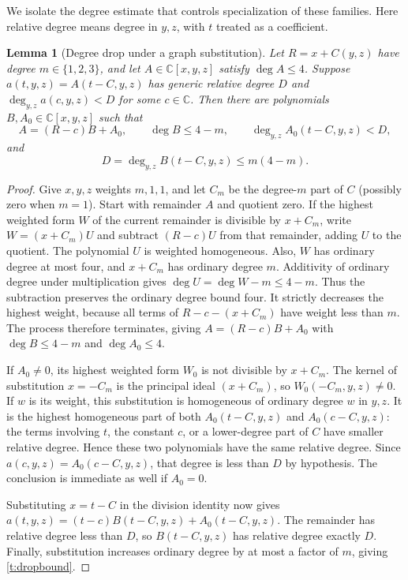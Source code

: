 \documentclass[11pt,reqno]{amsart}
\numberwithin{equation}{section}
\theoremstyle{plain}
\newtheorem{lemma}[theorem]{Lemma}
\theoremstyle{definition}
\theoremstyle{remark}
\newcommand{\C}{\mathbb C}
\begin{document}
We isolate the degree estimate that controls specialization of these
families. Here relative degree means degree in $y,z$, with $t$ treated
as a coefficient.
\begin{lemma}[Degree drop under a graph substitution]\label{lem:graph-degree-drop}
Let $R=x+C(y,z)$ have degree $m\in\{1,2,3\}$, and let
$A\in\C[x,y,z]$ satisfy $\deg A\le4$. Suppose
$a(t,y,z)=A(t-C,y,z)$ has generic relative degree $D$ and
$\deg_{y,z}a(c,y,z)<D$ for some $c\in\C$. Then there are polynomials
$B,A_0\in\C[x,y,z]$ such that
\[
 A=(R-c)B+A_0,\qquad \deg B\le4-m,
 \qquad \deg_{y,z}A_0(t-C,y,z)<D,
\]
and
\begin{equation}\label{t:dropbound}
 D=\deg_{y,z}B(t-C,y,z)\le m(4-m).
\end{equation}
\end{lemma}
\begin{proof}
Give $x,y,z$ weights $m,1,1$, and let $C_m$ be the degree-$m$ part
of $C$ (possibly zero when $m=1$). Start with remainder $A$ and
quotient zero. If the highest weighted form $W$ of the current
remainder is divisible by $x+C_m$, write $W=(x+C_m)U$ and subtract
$(R-c)U$ from that remainder, adding $U$ to the quotient.
The polynomial $U$ is weighted homogeneous. Also, $W$ has ordinary
degree at most four, and $x+C_m$ has ordinary degree $m$. Additivity
of ordinary degree under multiplication gives
$\deg U=\deg W-m\le4-m$. Thus the subtraction preserves the
ordinary degree bound four. It strictly decreases the highest weight,
because all terms of $R-c-(x+C_m)$ have weight less than $m$.
The process therefore terminates, giving
$A=(R-c)B+A_0$ with $\deg B\le4-m$ and $\deg A_0\le4$.

If $A_0\ne0$, its highest weighted form $W_0$ is not divisible by
$x+C_m$. The kernel of substitution $x=-C_m$ is the principal ideal
$(x+C_m)$, so $W_0(-C_m,y,z)\ne0$. If $w$ is its weight, this
substitution is homogeneous of ordinary degree $w$ in $y,z$.
It is the highest homogeneous part of both $A_0(t-C,y,z)$ and
$A_0(c-C,y,z)$: the terms involving $t$, the constant $c$, or a
lower-degree part of $C$ have smaller relative degree. Hence these
two polynomials have the same relative degree. Since
$a(c,y,z)=A_0(c-C,y,z)$, that degree is less than $D$ by hypothesis.
The conclusion is immediate as well if $A_0=0$.

Substituting $x=t-C$ in the division identity now gives
$a(t,y,z)=(t-c)B(t-C,y,z)+A_0(t-C,y,z)$. The remainder has relative
degree less than $D$, so $B(t-C,y,z)$ has relative degree exactly
$D$. Finally, substitution increases ordinary degree by at most a
factor of $m$, giving \eqref{t:dropbound}.
\end{proof}
\end{document}
